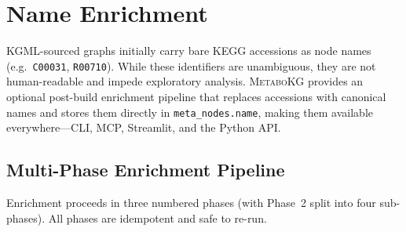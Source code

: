 \documentclass[10pt]{article}
\begin{document}
\section{Name Enrichment}
\label{sec:enrich}

KGML-sourced graphs initially carry bare KEGG accessions as node names
(e.g.\ \texttt{C00031}, \texttt{R00710}). While these identifiers are
unambiguous, they are not human-readable and impede exploratory analysis.
\textsc{MetaboKG} provides an optional post-build enrichment pipeline that
replaces accessions with canonical names and stores them directly in
\texttt{meta\_nodes.name}, making them available everywhere---CLI, MCP,
Streamlit, and the Python API.

\subsection{Multi-Phase Enrichment Pipeline}

Enrichment proceeds in three numbered phases (with Phase~2 split into four
sub-phases). All phases are idempotent and safe to re-run.
\end{document}
